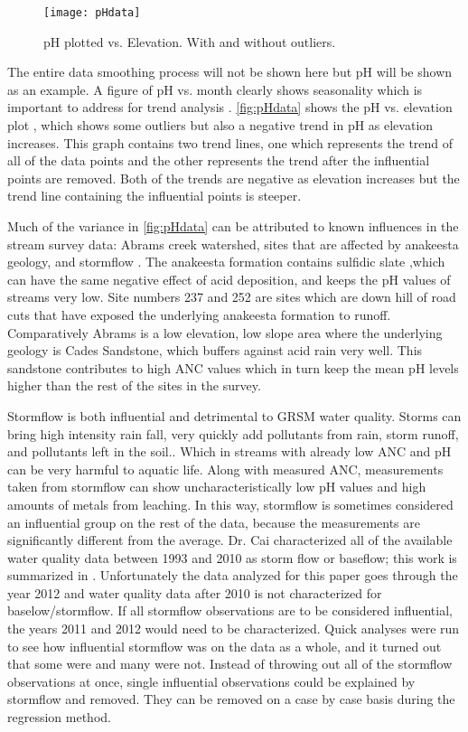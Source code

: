 \begin{figure}[h!]
\centering
	\texttt{[image: pHdata]}\\
	\caption{pH plotted vs. Elevation. With and without outliers.}
	\label{fig:pHdata}
\end{figure}

The entire data smoothing process will not be shown here but pH will be shown as an example.
A figure of pH vs. month clearly shows seasonality which is important to address for trend analysis \citep{helsel1992statistical}.
\autoref{fig:pHdata} shows the pH vs. elevation plot , which shows some outliers but also a negative trend in pH as elevation increases.
This graph contains two trend lines, one which represents the trend of all of the data points and the other represents the trend after the influential points are removed. 
Both of the trends are negative as elevation increases but the trend line containing the influential points is steeper. 

Much of the variance in \autoref{fig:pHdata} can be attributed to known influences in the stream survey data: Abrams creek watershed, sites that are affected by anakeesta geology, and stormflow \citep{neff2012influence}.  
The anakeesta formation contains sulfidic slate ,which can have the same negative effect of acid deposition,  and keeps the pH values of streams very low.
Site numbers 237 and 252 are sites which are down hill of road cuts that have exposed the underlying anakeesta formation to runoff.  
Comparatively Abrams is a low elevation, low slope area where the underlying geology is Cades Sandstone, which buffers against acid rain very well. 
This sandstone contributes to high ANC values which in turn keep the mean pH levels higher than the rest of the sites in the survey. 

Stormflow is both influential and detrimental  to GRSM water quality. 
Storms can bring high intensity rain fall, very quickly add pollutants from rain, storm runoff, and pollutants left in the soil.. 
Which in streams with already low ANC and pH can be very harmful to aquatic life.
Along with measured ANC, measurements taken from stormflow can show uncharacteristically low pH values and high amounts of metals from leaching. 
In this way, stormflow is sometimes considered an influential group on the rest of the data, because the measurements are significantly different from the average. 
Dr. Cai characterized all of the available water quality data between 1993 and 2010 as storm flow or baseflow; this work is summarized in \citet{cai2013}. 
Unfortunately the data analyzed for this paper goes through the year 2012 and water quality data after 2010 is not characterized for baselow/stormflow. 
If all stormflow observations are to be considered influential, the years 2011 and 2012 would need to be characterized. 
Quick analyses were run to see how influential stormflow was on the data as a whole, and it turned out that some were and many were not. 
Instead of throwing out all of the stormflow observations at once, single influential observations could be explained by stormflow and removed. 
They can be removed on a case by case basis during the regression method.

